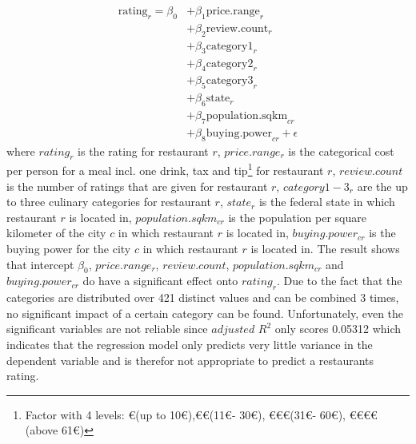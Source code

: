 \begin{equation}
	\begin{aligned}
	\mathrm{rating}_{r} = \beta_{0}
	&+ \beta_{1}  \mathrm{price.range}_{r} \\
	&+ \beta_{2}  \mathrm{review.count}_{r} \\
	&+ \beta_{3}  \mathrm{category1}_{r}    \\
	&+ \beta_{4}  \mathrm{category2}_{r} \\
	&+ \beta_{5}  \mathrm{category3}_{r} \\
	&+ \beta_{6}  \mathrm{state}_{r}   \\
	&+ \beta_{7}  \mathrm{population.sqkm}_{cr}  \\
	&+ \beta_{8}  \mathrm{buying.power}_{cr} + \epsilon
	\end{aligned}
	\label{eq:rating_regression}
\end{equation}
where $rating_r$ is the rating for restaurant $r$, $price.range_r$ is the categorical cost per person for a meal incl. one drink, tax and tip\footnote{Factor with 4 levels: \euro (up to 10\euro),\euro\euro (11\euro - 30\euro), \euro\euro\euro (31\euro - 60\euro), \euro\euro\euro\euro (above 61\euro) } for restaurant $r$, $review.count$ is the number of ratings that are given for restaurant $r$, $category1-3_r$ are the up to three culinary categories for restaurant $r$, $state_r$ is the federal state in which restaurant $r$ is located in, $population.sqkm_{cr}$ is the population per square kilometer of the city $c$ in which restaurant $r$ is located in, $buying.power_{cr}$ is the buying power for the city $c$ in which restaurant $r$ is located in. \newline
The result shows that  intercept $\beta_{0}$, $price.range_r$, $review.count$, $population.sqkm_{cr}$ and
$buying.power_{cr}$ do have a significant effect onto $rating_r$. Due to the fact that the categories are distributed over 421 distinct values and can be combined 3 times, no significant impact of a certain category can be found. Unfortunately, even the significant variables are not reliable since $adjusted$ $ R^2$ only scores 0.05312 which indicates that the regression model only predicts very little variance in the dependent variable and is therefor not appropriate to predict a restaurants rating.


